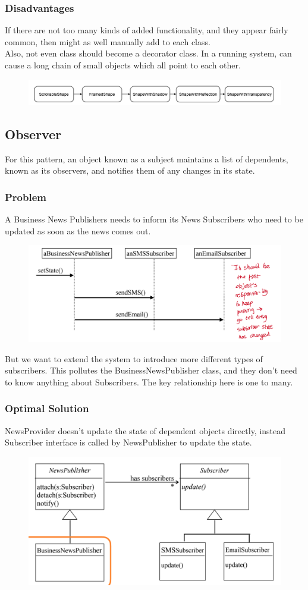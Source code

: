 \documentclass{article}
\begin{document}
\subsubsection*{Disadvantages}
If there are not too many kinds of added functionality, and they appear fairly common, then might as well manually add to each class. \\
Also, not even class should become a decorator class. In a running system, can cause a long chain of small objects which all point to each other.
\begin{figure}[H]
    \centering
    \includegraphics[width=0.7\linewidth]{Pictures/Screenshot 2023-02-05 at 12.42.17.png}
\end{figure}
\subsection{Observer}
For this pattern, an object known as a subject maintains a list of dependents, known as its observers, and notifies them of any changes in its state. \\
\subsubsection*{Problem}
A Business News Publishers needs to inform its News Subscribers who need to be updated as soon as the news comes out.
\begin{figure}[H]
    \centering
    \includegraphics[width=0.6\linewidth]{Pictures/Screenshot 2023-02-05 at 12.46.07.png}
\end{figure}
But we want to extend the system to introduce more different types of subscribers. This pollutes the BusinessNewsPublisher class, and they don't need to know anything about Subscribers. The key relationship here is one to many.
\subsubsection*{Optimal Solution}
NewsProvider doesn't update the state of dependent objects directly, instead Subscriber interface is called by NewsPublisher to update the state.
\begin{figure}[H]
    \centering
    \includegraphics[width=0.6\linewidth]{Pictures/Screenshot 2023-02-05 at 12.48.04.png}
\end{figure}
\end{document}

